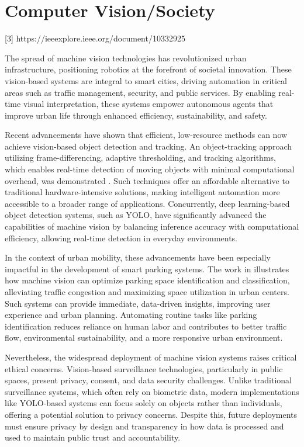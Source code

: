 \documentclass[conference]{IEEEtran}
\begin{document}
\section{Computer Vision/Society}

[3] https://ieeexplore.ieee.org/document/10332925

The spread of machine vision technologies has revolutionized urban infrastructure, 
positioning robotics at the forefront of societal innovation. 
These vision-based systems are integral to smart cities, 
driving automation in critical areas such as traffic management, 
security, 
and public services. 
By enabling real-time visual interpretation, 
these systems empower autonomous agents that improve urban life through enhanced efficiency, 
sustainability, and safety.

Recent advancements have shown that efficient, 
low-resource methods can now achieve vision-based object detection and tracking. 
An object-tracking approach utilizing frame-differencing, 
adaptive thresholding, 
and tracking algorithms, 
which enables real-time detection of moving objects with minimal computational overhead, 
was demonstrated \cite{wang_and_zhang}. 
Such techniques offer an affordable alternative to traditional hardware-intensive solutions, 
making intelligent automation more accessible to a broader range of applications. 
Concurrently, 
deep learning-based object detection systems, 
such as YOLO, 
have significantly advanced the capabilities of machine vision by balancing inference accuracy with computational efficiency, 
allowing real-time detection in everyday environments.

In the context of urban mobility, 
these advancements have been especially impactful in the development of smart parking systems. 
The work in \cite{smart_parking} illustrates how machine vision can optimize parking space identification and classification, 
alleviating traffic congestion and maximizing space utilization in urban centers. 
Such systems can provide immediate, 
data-driven insights, 
improving user experience and urban planning. 
Automating routine tasks like parking identification reduces reliance on human labor and contributes to better traffic flow, 
environmental sustainability, 
and a more responsive urban environment.

Nevertheless, 
the widespread deployment of machine vision systems raises critical ethical concerns. 
Vision-based surveillance technologies, 
particularly in public spaces, 
present privacy, 
consent, 
and data security challenges. 
Unlike traditional surveillance systems, 
which often rely on biometric data, 
modern implementations like YOLO-based systems can focus solely on objects rather than individuals, 
offering a potential solution to privacy concerns. 
Despite this, 
future deployments must ensure privacy by design and transparency in how data is processed and used to maintain public trust and accountability.
\end{document}
